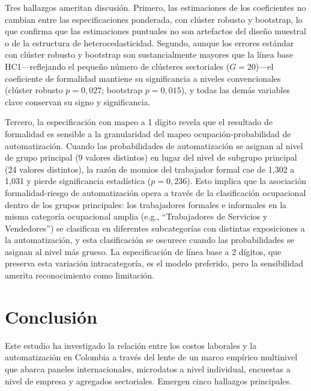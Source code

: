 \documentclass{article}
\begin{document}
Tres hallazgos ameritan discusi\'on. Primero, las estimaciones de los coeficientes no cambian entre las especificaciones ponderada, con cl\'uster robusto y bootstrap, lo que confirma que las estimaciones puntuales no son artefactos del dise\~no muestral o de la estructura de heterocedasticidad. Segundo, aunque los errores est\'andar con cl\'uster robusto y bootstrap son sustancialmente mayores que la l\'inea base HC1---reflejando el peque\~no n\'umero de cl\'usteres sectoriales ($G = 20$)---el coeficiente de formalidad mantiene su significancia a niveles convencionales (cl\'uster robusto $p = 0{,}027$; bootstrap $p = 0{,}015$), y todas las dem\'as variables clave conservan su signo y significancia.

Tercero, la especificaci\'on con mapeo a 1 d\'igito revela que el resultado de formalidad es sensible a la granularidad del mapeo ocupaci\'on-probabilidad de automatizaci\'on. Cuando las probabilidades de automatizaci\'on se asignan al nivel de grupo principal (9 valores distintos) en lugar del nivel de subgrupo principal (24 valores distintos), la raz\'on de momios del trabajador formal cae de 1,302 a 1,031 y pierde significancia estad\'istica ($p = 0{,}236$). Esto implica que la asociaci\'on formalidad-riesgo de automatizaci\'on opera a trav\'es de la clasificaci\'on ocupacional dentro de los grupos principales: los trabajadores formales e informales en la misma categor\'ia ocupacional amplia (e.g., ``Trabajadores de Servicios y Vendedores'') se clasifican en diferentes subcategor\'ias con distintas exposiciones a la automatizaci\'on, y esta clasificaci\'on se oscurece cuando las probabilidades se asignan al nivel m\'as grueso. La especificaci\'on de l\'inea base a 2 d\'igitos, que preserva esta variaci\'on intracategor\'ia, es el modelo preferido, pero la sensibilidad amerita reconocimiento como limitaci\'on.

\FloatBarrier

\section{Conclusi\'on}
\label{sec:conclusion}

Este estudio ha investigado la relaci\'on entre los costos laborales y la automatizaci\'on en Colombia a trav\'es del lente de un marco emp\'irico multinivel que abarca paneles internacionales, microdatos a nivel individual, encuestas a nivel de empresa y agregados sectoriales. Emergen cinco hallazgos principales.
\end{document}
